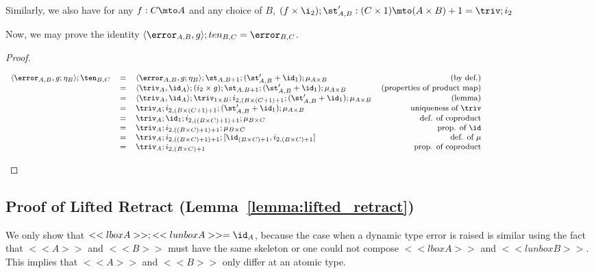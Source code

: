 Similarly, we also have for any $f : C \mto A$ and any
choice of $B$, $(f \times \i_2) ; \st^{\prime}_{A,B} : (C \times 1) \mto (A \times B) + 1 = \triv ; i_2$

Now, we may prove the identity $\langle \error_{A,B}, g \rangle ; ten_{B,C} = \error_{B,C}$.
\begin{proof}
  \begin{center}
    \begin{math} \footnotesize
    \begin{array}{rllr}
      \langle \error_{A,B}, g; \eta_B \rangle ; \ten_{B,C} & = & \langle \error_{A,B}, g; \eta_B \rangle ; \st_{A,B+1} ; (\st^{\prime}_{A,B} + \id_1); \mu_{A \times B} & \text{(by def.)} \\
      & = & \langle \triv_A, \id_A \rangle ; (i_2 \times g); \st_{A,B+1} ; (\st^{\prime}_{A,B} + \id_1); \mu_{A \times B} & \text{(properties of product map)} \\
      & = & \langle \triv_A, \id_A \rangle ; \triv_{1 \times B} ; i_{2,(B \times (C + 1) + 1} ; (\st^{\prime}_{A,B} + \id_1); \mu_{A \times B} & \text{(lemma)} \\
      & = & \triv_A ; i_{2,(B \times (C + 1) + 1} ; (\st^{\prime}_{A,B} + \id_1); \mu_{A \times B} & \text{ uniqueness of } \triv \\
      & = & \triv_A ; \id_1 ; i_{2,((B \times C) + 1) + 1} ; \mu_{B \times C} & \text{def. of coproduct} \\
      & = & \triv_A ; i_{2,((B \times C) + 1) + 1} ; \mu_{B \times C} & \text{prop. of } \id \\
      & = & \triv_A ; i_{2,((B \times C) + 1) + 1} ; [\id_{(B \times C) + 1}, i_{2, (B \times C) + 1}] & \text{def. of } \mu \\
      & = & \triv_A ; i_{2, (B \times C) + 1} & \text{prop. of coproduct} \\
    \end{array}
    \end{math}
  \end{center}
\end{proof}

\subsection{Proof of Lifted Retract (Lemma~\ref{lemma:lifted_retract})}
\label{subsec:proof_of_lifted_retract}
We only show that $<<lbox A>>;<<lunbox A>> = \id_A$, because the case
when a dynamic type error is raised is similar using the fact that
$<<A>>$ and $<<B>>$ must have the same skeleton or one could not
compose $<<lbox A>>$ and $<<lunbox B>>$. This implies that $<<A>>$ and
$<<B>>$ only differ at an atomic type.

